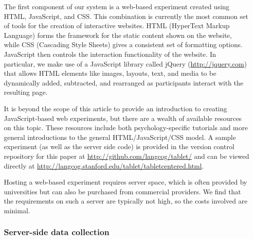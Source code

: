 \documentclass[man,noapacite]{apa2}
\begin{document}
The first component of our system is a web-based experiment created using HTML, JavaScript, and CSS. This combination is currently the most common set of tools for the creation of interactive websites. HTML (HyperText Markup Language) forms the framework for the static content shown on the website, while CSS (Cascading Style Sheets) gives a consistent set of formatting options. JavaScript then controls the interaction functionality of the website. In particular, we make use of a JavaScript library called jQuery (\url{http://jquery.com}) that allows HTML elements like images, layouts, text, and media to be dynamically added, subtracted, and rearranged as participants interact with the resulting page. 

It is beyond the scope of this article to provide an introduction to creating JavaScript-based web experiments, but there are a wealth of available resources on this topic. These resources include both psychology-specific tutorials and more general introductions to the general HTML/JavaScript/CSS model. A sample experiment (as well as the server side code) is provided in the version control repository for this paper  at \url{http://github.com/langcog/tablet/} and can be viewed directly at \url{http://langcog.stanford.edu/tablet/tabletcentered.html}.

Hosting a web-based experiment requires server space, which is often provided by universities but can also be purchased from commercial providers. We find that the requirements on such a server are typically not high, so the costs involved are minimal.




\subsubsection{Server-side data collection}
\end{document}
